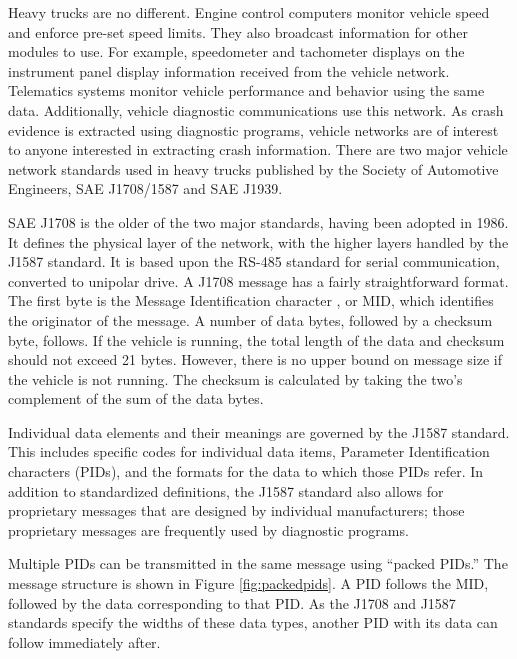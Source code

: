 Heavy trucks are no different. Engine control computers monitor vehicle speed and enforce pre-set speed limits. They also broadcast information
for other modules to use. For example, speedometer and tachometer displays on the instrument panel display information received from the vehicle
network. Telematics systems monitor vehicle performance and behavior using the same data. Additionally, vehicle diagnostic communications use
this network. As crash evidence is extracted using diagnostic programs, vehicle networks are of interest to anyone interested in extracting
crash information. There are two major vehicle network standards used in heavy trucks published by the Society of Automotive Engineers,
 SAE J1708/1587\cite{J1708}\cite{J1587} and SAE J1939\cite{J1939-71}.


SAE J1708 is the older of the two major standards, having been adopted in 1986. It defines the physical layer of the network,
with the higher layers handled by the J1587 standard. It is based upon the RS-485 standard for serial communication, converted to 
unipolar drive. A J1708 message has a fairly straightforward format. The first byte is the Message Identification character
, or MID, which identifies the originator of the message. A number of data bytes, followed by a checksum byte, follows. If the vehicle is running, 
the total length of the data and checksum should not exceed 21 bytes\cite{J1708}. However, there is no upper bound on message size if the vehicle 
is not running. The checksum is calculated by taking the two's complement of the sum of the data bytes.

Individual data elements and their meanings are governed by the J1587 standard\cite{J1587}. This includes specific codes for individual data items,
Parameter Identification characters (PIDs), and the formats for the data to which those PIDs refer. In addition to standardized definitions, 
the J1587 standard also allows for proprietary messages that are designed by individual manufacturers; those proprietary messages are frequently used by 
diagnostic programs.

Multiple PIDs can be transmitted in the same message using ``packed PIDs.'' The message structure is shown in Figure \ref{fig:packedpids}. A PID follows the MID, followed by
the data corresponding to that PID. As the J1708 and J1587 standards specify the widths of these data types, another PID with its data can follow immediately
after.

